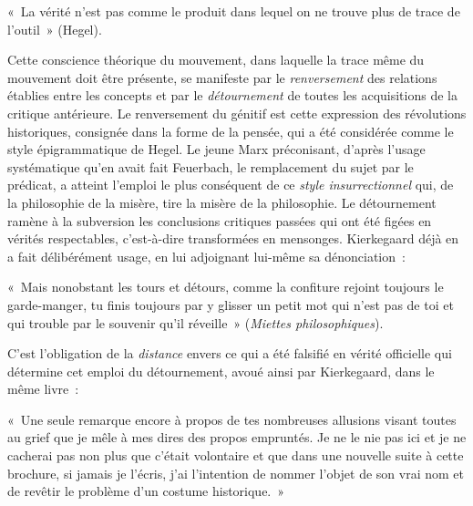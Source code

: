 \documentclass[french,twoside]{book} %
\newenvironment{quoteblock}%
  {\begin{quoting}}
  {\end{quoting}}
\newenvironment{quotebar}{%
    \def\FrameCommand{{\color{rubric!10!}\vrule width 0.5em} \hspace{0.9em}}%
    \def\OuterFrameSep{\itemsep} %
    \MakeFramed {\advance\hsize-\width \FrameRestore}
  }%
  {%
    \endMakeFramed
  }
\renewenvironment{quoteblock}%
  {%
    \savenotes
    \setstretch{0.9}
    \normalfont
    \begin{quotebar}
  }
  {%
    \end{quotebar}
    \spewnotes
  }
\begin{document}
\begin{quoteblock}
\noindent « La vérité n’est pas comme le produit dans lequel on ne trouve plus de trace de l’outil » (Hegel).\end{quoteblock}

\noindent Cette conscience théorique du mouvement, dans laquelle la trace même du mouvement doit être présente, se manifeste par le \emph{renversement} des relations établies entre les concepts et par le \emph{détournement} de toutes les acquisitions de la critique antérieure. Le renversement du génitif est cette expression des révolutions historiques, consignée dans la forme de la pensée, qui a été considérée comme le style épigrammatique de Hegel. Le jeune Marx préconisant, d’après l’usage systématique qu’en avait fait Feuerbach, le remplacement du sujet par le prédicat, a atteint l’emploi le plus conséquent de ce \emph{style insurrectionnel} qui, de la philosophie de la misère, tire la misère de la philosophie. Le détournement ramène à la subversion les conclusions critiques passées qui ont été figées en vérités respectables, c’est-à-dire transformées en mensonges. Kierkegaard déjà en a fait délibérément usage, en lui adjoignant lui-même sa dénonciation :\par

\begin{quoteblock}
\noindent « Mais nonobstant les tours et détours, comme la confiture rejoint toujours le garde-manger, tu finis toujours par y glisser un petit mot qui n’est pas de toi et qui trouble par le souvenir qu’il réveille » (\emph{Miettes philosophiques}).\end{quoteblock}

\noindent C’est l’obligation de la \emph{distance} envers ce qui a été falsifié en vérité officielle qui détermine cet emploi du détournement, avoué ainsi par Kierkegaard, dans le même livre :\par

\begin{quoteblock}
\noindent « Une seule remarque encore à propos de tes nombreuses allusions visant toutes au grief que je mêle à mes dires des propos empruntés. Je ne le nie pas ici et je ne cacherai pas non plus que c’était volontaire et que dans une nouvelle suite à cette brochure, si jamais je l’écris, j’ai l’intention de nommer l’objet de son vrai nom et de revêtir le problème d’un costume historique. »\end{quoteblock}
\end{document}
